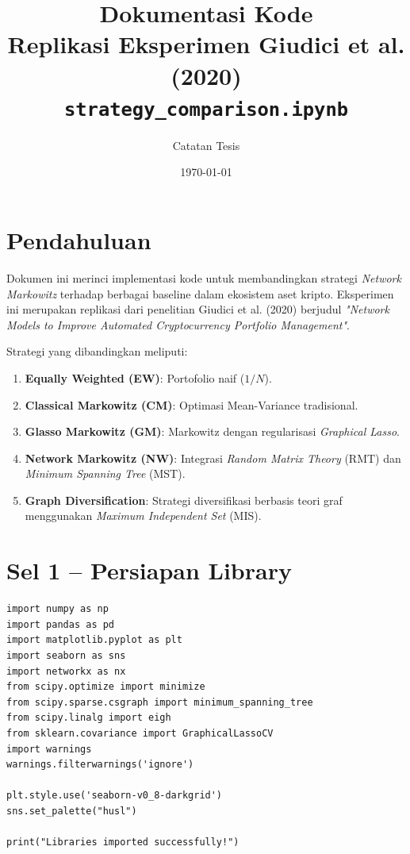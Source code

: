\documentclass[12pt,a4paper]{article}
\title{\textbf{Dokumentasi Kode} \\ \large Replikasi Eksperimen Giudici et al. (2020) \\
\small \texttt{strategy\_comparison.ipynb}}
\author{Catatan Tesis}
\date{\today}
\begin{document}
\maketitle
\tableofcontents
\newpage

\section{Pendahuluan}
Dokumen ini merinci implementasi kode untuk membandingkan strategi \textit{Network Markowitz} terhadap berbagai baseline dalam ekosistem aset kripto. Eksperimen ini merupakan replikasi dari penelitian Giudici et al. (2020) berjudul \textit{"Network Models to Improve Automated Cryptocurrency Portfolio Management"}.

Strategi yang dibandingkan meliputi:
\begin{enumerate}
    \item \textbf{Equally Weighted (EW)}: Portofolio naif ($1/N$).
    \item \textbf{Classical Markowitz (CM)}: Optimasi Mean-Variance tradisional.
    \item \textbf{Glasso Markowitz (GM)}: Markowitz dengan regularisasi \textit{Graphical Lasso}.
    \item \textbf{Network Markowitz (NW)}: Integrasi \textit{Random Matrix Theory} (RMT) dan \textit{Minimum Spanning Tree} (MST).
    \item \textbf{Graph Diversification}: Strategi diversifikasi berbasis teori graf menggunakan \textit{Maximum Independent Set} (MIS).
\end{enumerate}

\section{Sel 1 -- Persiapan Library}
\begin{lstlisting}[caption={Import libraries dan konfigurasi visualisasi}]
import numpy as np
import pandas as pd
import matplotlib.pyplot as plt
import seaborn as sns
import networkx as nx
from scipy.optimize import minimize
from scipy.sparse.csgraph import minimum_spanning_tree
from scipy.linalg import eigh
from sklearn.covariance import GraphicalLassoCV
import warnings
warnings.filterwarnings('ignore')

plt.style.use('seaborn-v0_8-darkgrid')
sns.set_palette("husl")

print("Libraries imported successfully!")
\end{lstlisting}
\end{document}
